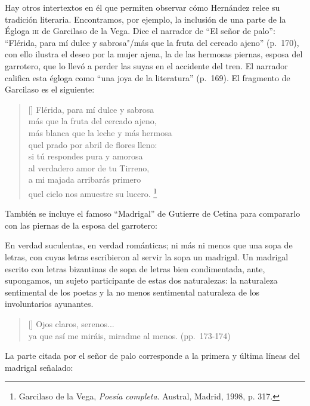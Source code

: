 \documentclass[14pt,twoside,final]{extbook} %
\let\oldfootnote\footnote
\renewcommand\footnote[1]{%
\oldfootnote{\hspace{1mm}#1}}
\begin{document}
Hay otros intertextos en él que permiten observar cómo Hernández relee su tradición literaria. Encontramos, por ejemplo, la inclusión de una parte de la Égloga \textsc{iii} de Garcilaso de la Vega. Dice el narrador de ``El señor de palo'': ``Flérida, para mí dulce y sabrosa"/más que la fruta del cercado ajeno'' (p.~170), con ello ilustra el deseo por la mujer ajena, la de las hermosas piernas, esposa del garrotero, que lo llevó a perder las suyas en el accidente del tren. El narrador califica esta égloga como ``una joya de la literatura'' (p.~169). El fragmento de Garcilaso es el siguiente:
\settowidth{\versewidth}{más blanca que la leche y más hermosa}
\begin{verse}[\versewidth]
Flérida, para mí dulce y sabrosa \\
más que la fruta del cercado ajeno, \\
más blanca que la leche y más hermosa \\
qu\textquotesingle{}el prado por abril de flores lleno: \\
si tú respondes pura y amorosa \\
al verdadero amor de tu Tirreno, \\
a mi majada arribarás primero \\
qu\textquotesingle{}el cielo nos amuestre su lucero.\footnote{Garcilaso de la Vega, \emph{Poesía completa}. Austral, Madrid, 1998, p. 317.}
\end{verse}
También se incluye el famoso ``Madrigal'' de Gutierre de Cetina para compararlo con las piernas de la esposa del garrotero:
\begin{quoting}
En verdad suculentas, en verdad románticas; ni más ni menos que una sopa de letras, con cuyas letras escribieron al servir la sopa un madrigal. Un madrigal escrito con letras bizantinas
de sopa de letras bien condimentada, ante, supongamos, un sujeto participante de estas dos naturalezas: la naturaleza sentimental de los poetas y la no menos sentimental naturaleza de los involuntarios ayunantes.
\begin{verse}[\versewidth]
Ojos claros, serenos... \\
ya que así me miráis, miradme al menos. (pp.~\mbox{173-174})
\end{verse}
\end{quoting}
La parte citada por el señor de palo corresponde a la primera y última líneas del madrigal señalado:
\settowidth{\versewidth}{ya que así me miráis, miradme al menos.}
\end{document}
